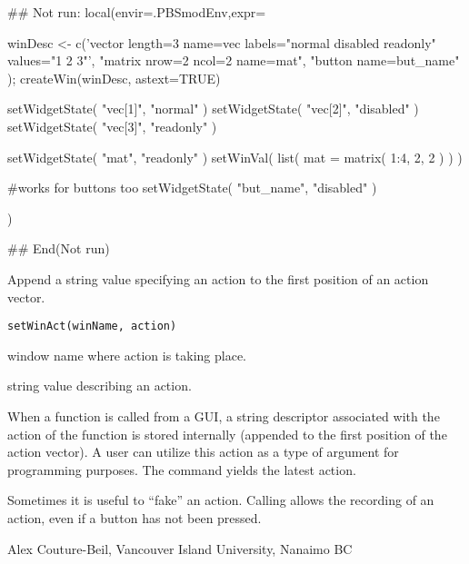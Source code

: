 \documentclass[letterpaper]{book}
\begin{document}
%
\begin{Examples}
\begin{ExampleCode}
## Not run: 
local(envir=.PBSmodEnv,expr={
  winDesc <- c('vector length=3 name=vec labels="normal disabled readonly" values="1 2 3"',
             "matrix nrow=2 ncol=2 name=mat", "button name=but_name" );
  createWin(winDesc, astext=TRUE)

  setWidgetState( "vec[1]", "normal" )
  setWidgetState( "vec[2]", "disabled" )
  setWidgetState( "vec[3]", "readonly" )

  setWidgetState( "mat", "readonly" )
  setWinVal( list( mat = matrix( 1:4, 2, 2 ) ) )

  #works for buttons too
  setWidgetState( "but_name", "disabled" )
})

## End(Not run)
\end{ExampleCode}
\end{Examples}
%
\begin{Description}\relax
Append a string value specifying an action to the first position of an 
action vector.
\end{Description}
%
\begin{Usage}
\begin{verbatim}
setWinAct(winName, action)
\end{verbatim}
\end{Usage}
%
\begin{Arguments}
\begin{ldescription}
\item[\code{winName}] window name where action is taking place.
\item[\code{action}] string value describing an action.
\end{ldescription}
\end{Arguments}
%
\begin{Details}\relax
When a function is called from a GUI, a string descriptor associated with 
the action of the function is stored internally (appended to the first position 
of the action vector). A user can utilize this action as a type of argument 
for programming purposes. The command  yields the latest action.

Sometimes it is useful to ``fake'' an action. Calling  allows 
the recording of an action, even if a button has not been pressed.
\end{Details}
%
\begin{Author}\relax
Alex Couture-Beil, Vancouver Island University, Nanaimo BC
\end{Author}
\end{document}
